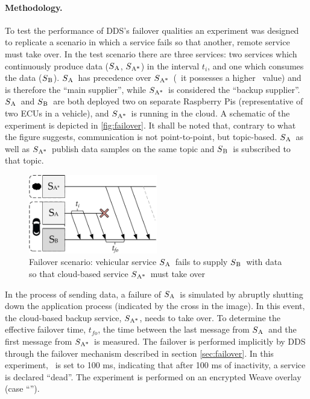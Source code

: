 \newcommand{\proda}{$S\textsubscript{A}$}
\newcommand{\prodb}{$S\textsubscript{A*}$}
\newcommand{\cons}{$S\textsubscript{B}$}

\paragraph{Methodology.} To test the performance of DDS's failover qualities an experiment was designed to replicate a scenario in which a service fails so that another, remote service must take over. In the test scenario there are three services: two services which continuously produce data (\proda , \prodb) in the interval $t_i$, and one which consumes the data (\cons). \proda\ has precedence over \prodb\ (\ie\ it possesses a higher \ownership\ value) and is therefore the ``main supplier'', while \prodb\ is considered the ``backup supplier''. \proda\ and \cons\ are both deployed two on separate Raspberry Pis (representative of two ECUs in a vehicle), and \prodb\ is running in the cloud. A schematic of the experiment is depicted in \autoref{fig:failover}. It shall be noted that, contrary to what the figure suggests, communication is not point-to-point, but topic-based. \proda\ as well as \prodb\ publish data samples on the same topic and \cons\ is subscribed to that topic.
\begin{figure}[htpb]
  \centering
  \includegraphics[width=0.5\textwidth]{figures/takeover}
  \caption[Failover experiment schematic]{Failover scenario: vehicular service \proda\ fails to supply \cons\ with data so that cloud-based service \prodb\ must take over}\label{fig:failover}
\end{figure}

In the process of sending data, a failure of \proda\ is simulated by abruptly shutting down the application process (indicated by the cross in the image). In this event, the cloud-based backup service, \prodb , needs to take over. To determine the effective failover time, $t_{fo}$, the time between the last message from \proda\ and the first message from \prodb\ is measured. The failover is performed implicitly by DDS through the failover mechanism described in section \ref{sec:failover}. In this experiment, \liveliness\ is set to 100 ms, indicating that after 100 ms of inactivity, a service is declared ``dead''. The experiment is performed on an encrypted Weave overlay (case ``'').

